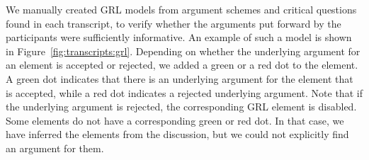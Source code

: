 We manually created GRL models from argument schemes and critical questions found in each transcript, to verify whether the arguments put forward by the participants were sufficiently informative. An example of such a model is shown in Figure~\ref{fig:transcripts:grl}. %
Depending on whether the underlying argument for an element is accepted or rejected, we added a green or a red dot to the element. 
A green dot indicates that there is an underlying argument for the element that is accepted, while a red dot indicates a rejected underlying argument. Note that if the underlying argument is rejected, the corresponding GRL element is disabled. Some elements do not have a corresponding green or red dot. In that case, we have inferred the elements from the discussion, but we could not explicitly find an argument for them.


